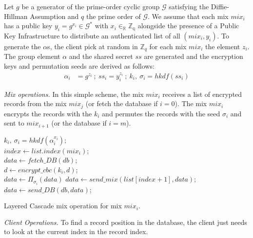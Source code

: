 \documentclass[USenglish,oneside,twocolumn]{article}
\begin{document}
Let $g$ be a generator of the prime-order cyclic group $\mathcal{G}$ satisfying the Diffie-Hillman Assumption and $q$ the prime order of $\mathcal{G}$. We assume that each mix $mix_i$ has a public key $y_i=g^{x_i}\in \mathcal{G}^*$ with $x_i \in_{\mathbb{R}} \mathbb{Z_q}$ alongside the presence of a Public Key Infrastructure to distribute an authenticated list of all $(mix_i, y_i)$.
To generate the $\alpha$s, the client pick at random in $\mathbb{Z}_q$ for each mix $mix_i$ the element $z_i$. The group element $\alpha$ and the shared secret $ss$ are generated and the encryption keys and permutation seeds are derived as follows:
\begin{align*}
\alpha_i &= g^{z_i}\ ;\ ss_i = y_i^{z_i}\ ;\ k_i,\ \sigma_i=hkdf(ss_i)
\end{align*}

\noindent\textit{Mix operations.} In this simple scheme, the mix $mix_i$ receives a list of encrypted records from the mix $mix_j$ (or fetch the database if $i=0$). The mix $mix_i$ encrypts the records with the $k_i$ and permutes the records  with the seed $\sigma_{i}$ and sent to $mix_{i+1}$ (or the database if $i=m$).\\

\begin{algorithm}
\DontPrintSemicolon
{}
$k_i,\ \sigma_{i}=hkdf(\alpha_{i}^{x_i})$;\\
$index \gets list.index(mix_i)$;\\
{
$data \gets fetch\_DB(db)$;\\
}
{
	$d \gets encrypt\_cbc(k_i, d)$;\\
}
$data \gets \Pi_{\sigma_i}(data)$
{
$data \gets send\_mix(list[index+1], data)$;\\
}
\Else
{
$data \gets send\_DB(db, data)$;\\
}
\caption{Layered Cascade mix operation for mix $mix_i$.}
\label{alg:CL}
\end{algorithm}

\noindent\textit{Client Operations.} To find a record position in the database, the client just needs to look at the current index in the record index.\\
\end{document}
